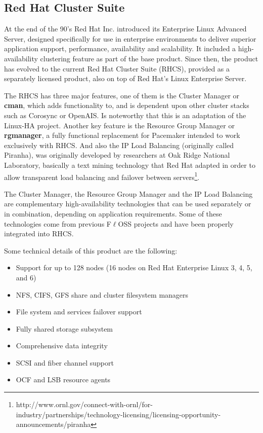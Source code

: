 \documentclass[a4paper, 12pt]{book}
\begin{document}
\subsection{Red Hat Cluster Suite}
\label{subsec:rhcs}

At the end of the 90's Red Hat Inc. introduced its Enterprise Linux Advanced Server, designed specifically for use in enterprise environments to deliver superior application support, performance, availability and scalability. It included a high-availability clustering feature as part of the base product. Since then, the product has evolved to the current Red Hat Cluster Suite (RHCS), provided as a separately licensed product, also on top of Red Hat's Linux Enterprise Server.\bigskip

\noindent The RHCS has three major features, one of them is the Cluster Manager or \textbf{cman}, which adds functionality to, and is dependent upon other cluster stacks such as Corosync or OpenAIS. Is noteworthy that this is an adaptation of the Linux-HA project. Another key feature is the Resource Group Manager or \textbf{rgmanager}, a fully functional replacement for Pacemaker intended to work exclusively with RHCS. And also the IP Load Balancing (originally called Piranha), was originally developed by researchers at Oak Ridge National Laboratory, basically a text mining technology that Red Hat adapted in order to allow transparent load balancing and failover between servers\footnote{http://www.ornl.gov/connect-with-ornl/for-industry/partnerships/technology-licensing/licensing-opportunity-announcements/piranha}.\bigskip

\noindent The Cluster Manager, the Resource Group Manager and the IP Load Balancing are complementary high-availability technologies that can be used separately or in combination, depending on application requirements. Some of these technologies come from previous F$\ell$OSS projects and have been properly integrated into RHCS.\bigskip

\noindent Some technical details of this product are the following:

\begin{itemize}
	\item Support for up to 128 nodes (16 nodes on Red Hat Enterprise Linux 3, 4, 5, and 6)
	\item NFS, CIFS, GFS share and cluster filesystem managers
	\item File system and services failover support
	\item Fully shared storage subsystem
	\item Comprehensive data integrity
	\item SCSI and fiber channel support
	\item OCF and LSB resource agents
\end{itemize}
\end{document}
